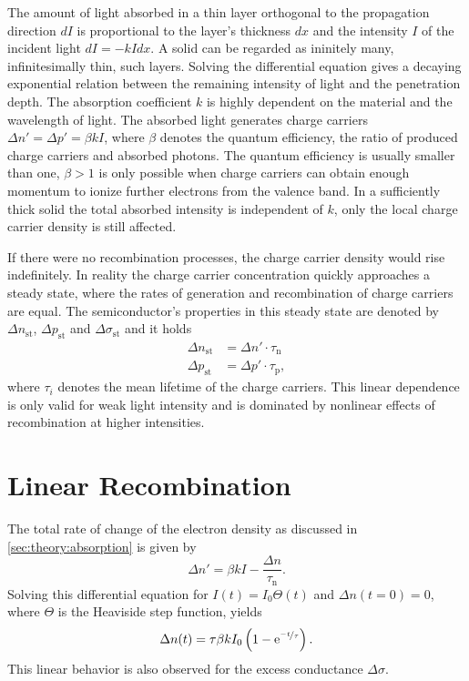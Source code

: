 The amount of light absorbed in a thin layer orthogonal to the propagation direction $dI$ is proportional to the layer's thickness $dx$ and the intensity $I$ of the incident light $dI = - k I dx$.
A solid can be regarded as ininitely many, infinitesimally thin, such layers.
Solving the differential equation gives a decaying exponential relation between the remaining intensity of light and the penetration depth.
The absorption coefficient $k$ is highly dependent on the material and the wavelength of light.
The absorbed light generates charge carriers $\Delta n' = \Delta p' = \beta k I$, where $\beta$ denotes the quantum efficiency, the ratio of produced charge carriers and absorbed photons.
The quantum efficiency is usually smaller than one, $\beta > 1$ is only possible when charge carriers can obtain enough momentum to ionize further electrons from the valence band.
In a sufficiently thick solid the total absorbed intensity is independent of $k$, only the local charge carrier density is still affected.

If there were no recombination processes, the charge carrier density would rise indefinitely.
In reality the charge carrier concentration quickly approaches a steady state, where the rates of generation and recombination of charge carriers are equal.
The semiconductor's properties in this steady state are denoted by $\Delta n_\text{st}$, $\Delta p_\text{st}$ and $\Delta \sigma_\text{st}$ and it holds
\begin{align*}
	\Delta n_\text{st} &= \Delta n' \cdot \tau_\text{n} \\
	\Delta p_\text{st} &= \Delta p' \cdot \tau_\text{p},
\end{align*}
where $\tau_i$ denotes the mean lifetime of the charge carriers.
This linear dependence is only valid for weak light intensity and is dominated by nonlinear effects of recombination at higher intensities.

\section{Linear Recombination}
The total rate of change of the electron density as discussed in \autoref{sec:theory:absorption} is given by
\begin{equation*}
	\Delta n' = \beta k I - \frac{\Delta n}{\tau_\text{n}}.
\end{equation*}
Solving this differential equation for $I(t) = I_0 \Theta (t)$ and $\Delta n (t = 0) = 0$, where $\Theta$ is the Heaviside step function, yields
\begin{equation}
	\Delta n (t) = \tau \beta k I_0 \left(1 - \mathrm{e}^{\nicefrac{-t}{\tau}}\right).
\end{equation}
This linear behavior is also observed for the excess conductance $\Delta \sigma$.

